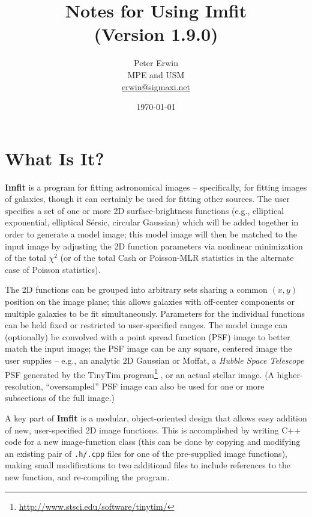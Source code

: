 \documentclass[10pt,a4paper,article]{memoir}
\newcommand{\imfit}{\textbf{Imfit}}
\newcommand{\Imfit}{\textbf{Imfit}}
\newcommand{\chisquare}{\ensuremath{\chi^{2}}}
\newcommand{\versionnum}{1.9.0}
\begin{document}
\title{
  Notes for Using Imfit \\
  (Version \versionnum{})
}
\author{
  Peter Erwin\\
  MPE and USM\\
  \href{mailto:erwin@sigmaxi.net}{erwin@sigmaxi.net}
}
\date{\today}  %

\maketitle

\tableofcontents


\newpage

\chapter{What Is It?}

\Imfit{} is a program for fitting astronomical images -- specifically,
for fitting images of galaxies, though it can certainly be used for
fitting other sources. The user specifies a set of one or more 2D
surface-brightness functions (e.g., elliptical exponential, elliptical
S\'ersic, circular Gaussian) which will be added together in order to
generate a model image; this model image will then be matched to the
input image by adjusting the 2D function parameters via nonlinear
minimization of the total \chisquare{} (or of the total Cash or
Poisson-MLR statistics in the alternate case of Poisson statistics).

The 2D functions can be grouped into arbitrary sets sharing a common $(x,y)$
position on the image plane; this allows galaxies with off-center components
or multiple galaxies to be fit simultaneously. Parameters for the individual
functions can be held fixed or restricted to user-specified ranges. The
model image can (optionally) be convolved with a point spread
function (PSF) image to better match the input image; the PSF image can
be any square, centered image the user supplies -- e.g., an analytic 2D Gaussian
or Moffat, a \textit{Hubble Space Telescope} PSF generated by the TinyTim
program\footnote{\url{http://www.stsci.edu/software/tinytim/}} \citep{krist95}, 
or an actual stellar image. (A higher-resolution, ``oversampled'' PSF image
can also be used for one or more subsections of the full image.) 

A key part of \imfit{} is a modular, object-oriented design that allows easy
addition of new, user-specified 2D image functions. This is accomplished by
writing C++ code for a new image-function class (this can be done by copying and
modifying an existing pair of \texttt{.h/.cpp} files for one of the pre-supplied
image functions), making small modifications to two additional files to include
references to the new function, and re-compiling the program.
\end{document}
